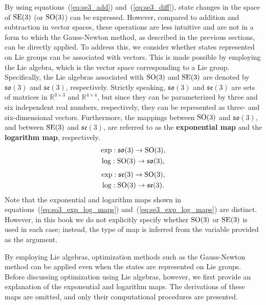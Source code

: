 By using equations~(\ref{eq:se3_add}) and~(\ref{eq:se3_diff}), state changes in the space of ${\rm SE}(3)$ (or ${\rm SO}(3)$) can be expressed.
However, compared to addition and subtraction in vector spaces, these operations are less intuitive and are not in a form to which the Gauss-Newton method, as described in the previous sections, can be directly applied.
To address this, we consider whether states represented on Lie groups can be associated with vectors.
This is made possible by employing the Lie algebra, which is the vector space corresponding to a Lie group.
Specifically, the Lie algebras associated with ${\rm SO}(3)$ and ${\rm SE}(3)$ are denoted by $\mathfrak{so}(3)$ and $\mathfrak{se}(3)$, respectively.
Strictly speaking, $\mathfrak{so}(3)$ and $\mathfrak{se}(3)$ are sets of matrices in $\mathbb{R}^{3 \times 3}$ and $\mathbb{R}^{4 \times 4}$, but since they can be parameterized by three and six independent real numbers, respectively, they can be represented as three- and six-dimensional vectors.
Furthermore, the mappings between ${\rm SO}(3)$ and $\mathfrak{so}(3)$, and between ${\rm SE}(3)$ and $\mathfrak{se}(3)$, are referred to as the {\bf exponential map} and the {\bf logarithm map}, respectively.
%
\begin{align}
  \begin{gathered}
    \exp: \mathfrak{so}(3) \rightarrow {\rm SO}(3), \\
    \log: {\rm SO}(3) \rightarrow \mathfrak{so}(3), \\
  \end{gathered}
  \label{eq:so3_exp_log_maps}
\end{align}
%
\begin{align}
  \begin{gathered}
    \exp: \mathfrak{se}(3) \rightarrow {\rm SO}(3), \\
    \log: {\rm SO}(3) \rightarrow \mathfrak{se}(3). \\
  \end{gathered}
  \label{eq:se3_exp_log_maps}
\end{align}
%
Note that the exponential and logarithm maps shown in equations~(\ref{eq:so3_exp_log_maps}) and~(\ref{eq:se3_exp_log_maps}) are distinct.
However, in this book we do not explicitly specify whether ${\rm SO}(3)$ or ${\rm SE}(3)$ is used in each case; instead, the type of map is inferred from the variable provided as the argument.

By employing Lie algebras, optimization methods such as the Gauss-Newton method can be applied even when the states are represented on Lie groups.
Before discussing optimization using Lie algebras, however, we first provide an explanation of the exponential and logarithm maps.
The derivations of these maps are omitted, and only their computational procedures are presented.














